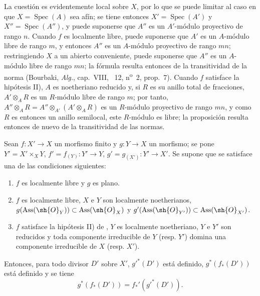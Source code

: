 
La cuestión es evidentemente local sobre $X$, por lo que se puede limitar al caso en que $X=\operatorname{Spec}(A)$ sea afín;
se tiene entonces $X'=\operatorname{Spec}(A')$ y $X''=\operatorname{Spec}(A'')$, y puede suponerse que $A''$ es un $A'$-módulo proyectivo de rango $n$.
Cuando $f$ es localmente libre, puede suponerse que $A'$ es un $A$-módulo libre de rango $m$, y entonces $A''$ es un $A$-módulo proyectivo de rango $mn$; restringiendo $X$ a un abierto conveniente, puede suponerse que $A''$ es un $A$-módulo libre de rango $mn$;
la fórmula  resulta entonces de la transitividad de la norma (Bourbaki, \emph{Alg.}, cap.~VIII, \textsection~12, n\textsuperscript{o}~2, prop.~7).
Cuando $f$ satisface la hipótesis II), $A$ es noetheriano reducido y, si $R$ es su anillo total de fracciones, $A'\otimes_A R$ es un $R$-módulo libre de rango $m$; por tanto, $A''\otimes_A R=A''\otimes_{A'}(A'\otimes_A R)$ es un $R$-módulo proyectivo de rango $mn$, y como $R$ es entonces un anillo semilocal, este $R$-módulo es libre;
la proposición resulta entonces de nuevo de la transitividad de las normas.

\begin{proposition}[21.5.8]
\label{IV.21.5.8}
Sean $f:X'\to X$ un morfismo finito y $g:Y\to X$ un morfismo;
se pone $Y'=X'\times_XY$, $f'=f_{(Y)}:Y'\to Y$, $g'=g_{(X')}:Y'\to X'$.
Se supone que se satisface una de las condiciones siguientes:
\begin{enumerate}[label=\textup{(\roman*)}]
  \item $f$ es localmente libre y $g$ es plano.
  \item $f$ es localmente libre, $X$ e $Y$ son localmente noetherianos, $g(\operatorname{Ass}(\sh{O}_Y))\subset\operatorname{Ass}(\sh{O}_X)$ y $g'(\operatorname{Ass}(\sh{O}_{Y'}))\subset\operatorname{Ass}(\sh{O}_{X'})$.
  \item $f$ satisface la hipótesis \textup{II)} de , $Y$ es localmente noetheriano, $Y$ e $Y'$ son reducidos y toda componente irreducible de $Y$ \textup{(resp.} $Y'$\textup{)} domina una componente irreducible de $X$ \textup{(resp.} $X'$\textup{)}.
\end{enumerate}
Entonces, para todo divisor $D'$ sobre $X'$, $g'^*(D')$ está definido, $g^*(f_*(D'))$ está definido y se tiene
\[
\label{IV.21.5.8.1}
  g^*(f_*(D'))=f_*'(g'^*(D')).
  \tag{21.5.8.1}
\]
\end{proposition}


